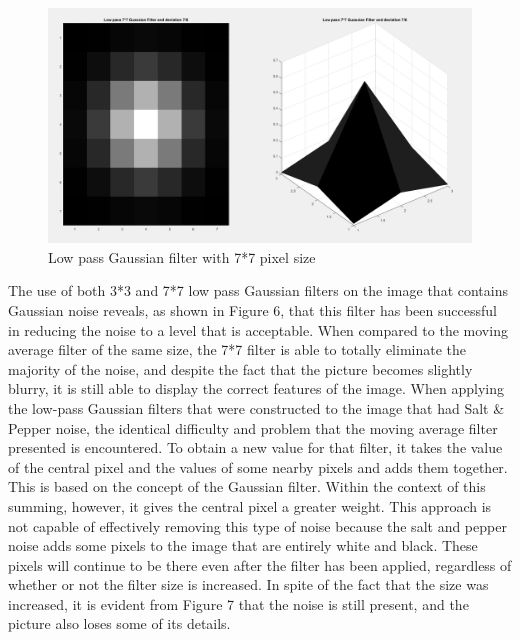 \begin{figure} [ht]
    \centering
    \includegraphics[width = \textwidth]{Resources/Low pass Gaussian filter.png}
    \caption{Low pass Gaussian filter with 7*7 pixel size}
    \label{fig:Low pass Gaussian filter}
\end{figure}

The use of both 3*3 and 7*7 low pass Gaussian filters on the image that contains Gaussian noise reveals, as shown in Figure 6, that this filter has been successful in reducing the noise to a level that is acceptable. When compared to the moving average filter of the same size, the 7*7 filter is able to totally eliminate the majority of the noise, and despite the fact that the picture becomes slightly blurry, it is still able to display the correct features of the image.
When applying the low-pass Gaussian filters that were constructed to the image that had Salt \& Pepper noise, the identical difficulty and problem that the moving average filter presented is encountered. To obtain a new value for that filter, it takes the value of the central pixel and the values of some nearby pixels and adds them together. This is based on the concept of the Gaussian filter. Within the context of this summing, however, it gives the central pixel a greater weight. This approach is not capable of effectively removing this type of noise because the salt and pepper noise adds some pixels to the image that are entirely white and black. These pixels will continue to be there even after the filter has been applied, regardless of whether or not the filter size is increased. In spite of the fact that the size was increased, it is evident from Figure 7 that the noise is still present, and the picture also loses some of its details. 

